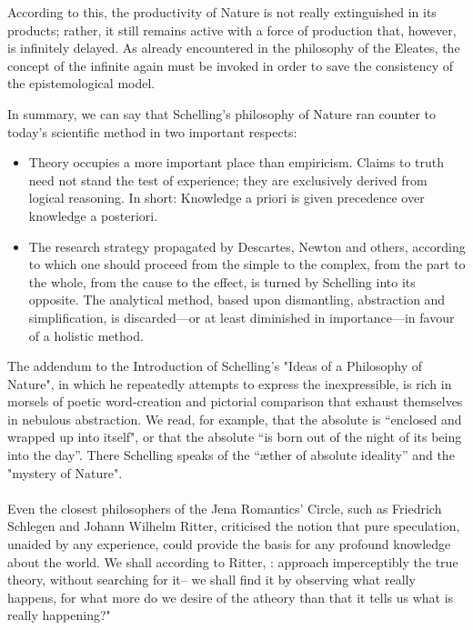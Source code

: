 \documentclass[9pt,a4paper,twocolumn]{article}
\newcounter{theo}
\begin{document}
            According to this, the productivity of Nature is not really extinguished in its products; rather, it still remains active with a force of production that, however, is infinitely delayed. As already encountered in the philosophy of the Eleates, the concept of the infinite again must be invoked in order to save the consistency of the epistemological model.\cite{Kuppers2018-vv}

            In summary, we can say that Schelling's philosophy of Nature ran counter to today's scientific method in two important respects: 
            \begin{itemize}
                \item Theory occupies a more important place than empiricism. Claims to truth need not stand the test of experience; they are exclusively derived from logical reasoning. In short: Knowledge a priori is given precedence over knowledge a posteriori.
                \item The research strategy propagated by Descartes, Newton and others, according to which one should proceed from the simple to the complex, from the part to the whole, from the cause to the effect, is turned by Schelling into its opposite. The analytical method, based upon dismantling, abstraction and simplification, is discarded—or at least diminished in importance—in favour of a holistic method.
            \end{itemize}
            The addendum to the Introduction of Schelling's "Ideas of a Philosophy of Nature", in which he repeatedly attempts to express the inexpressible, is rich in morsels of poetic word-creation and pictorial comparison that exhaust themselves in nebulous abstraction. We read, for example, that the absolute is “enclosed and wrapped up into itself", or that the absolute “is born out of the night of its being into the day”. There Schelling speaks of the “æther of absolute ideality” and the "mystery of Nature".
            \\
            \\
            Even the closest philosophers of the Jena Romantics' Circle, such as Friedrich Schlegen and Johann Wilhelm Ritter, criticised the notion that pure speculation, unaided by any experience, could provide the basis for any profound knowledge about the world. We shall according to Ritter, : approach imperceptibly the true theory, without searching for it-- we shall find it by observing what really happens, for what more do we desire of the atheory than that it tells us what is really happening?"\cite{Kuppers2018-vv} 
\end{document}
